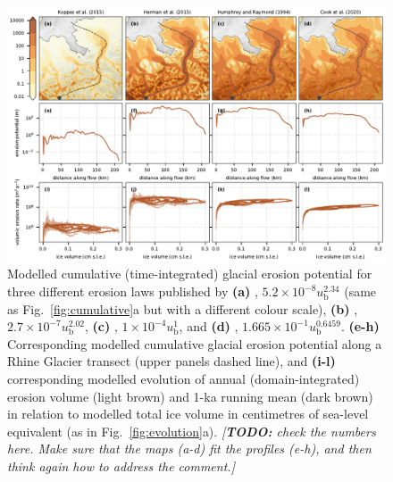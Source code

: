 \documentclass[esurf, manuscript]{copernicus}
\newcommand{\todo}[1]{\textcolor{Rd}{\emph{[\textbf{TODO:} #1]}}}
\begin{document}
    \begin{figure}[t]
      \centerline{\includegraphics{alpero_powerlaws}}
      \caption{%
        Modelled cumulative (time-integrated) glacial erosion potential for
        three different erosion laws published by
        \textbf{(a)} \citet{Koppes.etal.2015},
          ${5.2 \times 10^{-8} u_\mathrm{b}^{2.34}}$ (same as
          Fig.~\ref{fig:cumulative}a but with a different colour scale),
        \textbf{(b)} \citet{Herman.etal.2015},
          ${2.7 \times 10^{-7} u_\mathrm{b}^{2.02}}$,
        \textbf{(c)} \citet{Humphrey.Raymond.1994},
          ${1 \times 10^{-4} u_\mathrm{b}^{1}}$, and
        \textbf{(d)} \citet{Cook.etal.2020},
          ${1.665 \times 10^{-1} u_\mathrm{b}^{0.6459}}$.
        \textbf{(e-h)} Corresponding modelled cumulative glacial erosion
          potential along a Rhine Glacier transect (upper panels dashed line), and
        \textbf{(i-l)} corresponding modelled evolution of annual
        (domain-integrated) erosion volume (light brown) and 1-ka
        running mean (dark brown) in relation to modelled total ice volume in
        centimetres of sea-level equivalent (as in Fig.~\ref{fig:evolution}a).
        \todo{check the numbers here. Make sure that the maps (a-d) fit the
          profiles (e-h), and then think again how to address the comment.}}
      \label{fig:powerlaws}
    \end{figure}
\end{document}
